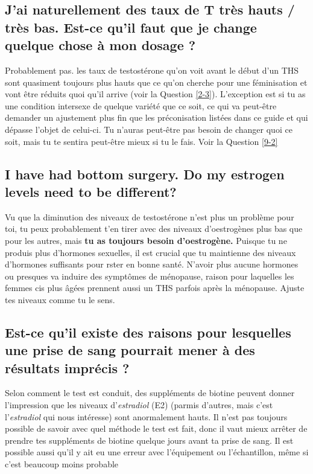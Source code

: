 \documentclass{article}
\begin{document}
\subsection{J'ai naturellement des taux de T très hauts / très bas. Est-ce qu'il faut que je change quelque chose à mon dosage ?}

Probablement pas. les taux de testostérone qu'on voit avant le début d'un THS sont quasiment toujours plus hauts que ce qu'on cherche pour une féminisation et vont être réduits quoi qu'il arrive (voir la Question \ref{2-3}). L'exception est si tu as une condition intersexe de quelque variété que ce soit, ce qui va peut-être demander un ajustement plus fin que les préconisation listées dans ce guide et qui dépasse l'objet de celui-ci. Tu n'auras peut-être pas besoin de changer quoi ce soit, mais tu te sentira peut-être mieux si tu le fais. Voir la Question \ref{9-2}

\subsection{I have had bottom surgery. Do my estrogen levels need to be different?}

Vu que la diminution des niveaux de testostérone n'est plus un problème pour toi, tu peux probablement t'en tirer avec des niveaux d'oestrogènes plus bas que pour les autres, mais \textbf{tu as toujours besoin d'oestrogène.} Puisque tu ne produis plus d'hormones sexuelles, il est crucial que tu maintienne des niveaux d'hormones suffisants pour rster en bonne santé. N'avoir plus aucune hormones ou presques va induire des symptômes de ménopause, raison pour laquelles les femmes cis plus âgées prennent aussi un THS parfois après la ménopause. Ajuste tes niveaux comme tu le sens.

\subsection{Est-ce qu'il existe des raisons pour lesquelles une prise de sang pourrait mener à des résultats imprécis ?}

Selon comment le test est conduit, des suppléments de biotine peuvent donner l'impression que les niveaux d'\textit{estradiol} (E2) (parmis d'autres, mais c'est l'\textit{estradiol} qui nous intéresse) sont anormalement hauts. Il n'est pas toujours possible de savoir avec quel méthode le test est fait, donc il vaut mieux arrêter de prendre tes suppléments de biotine quelque jours avant ta prise de sang. Il est possible aussi qu'il y ait eu une erreur avec l'équipement ou l'échantillon, même si c'est beaucoup moins probable 
\end{document}
